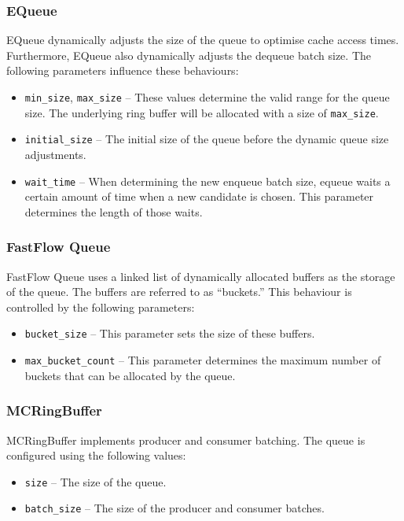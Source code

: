 \subsubsection*{EQueue}
EQueue dynamically adjusts the size of the queue to optimise cache access times\cite{EQueue}. Furthermore,
EQueue also dynamically adjusts the dequeue batch size. The following parameters influence these behaviours:
\begin{itemize}
    \item \texttt{min\_size}, \texttt{max\_size} -- These values determine the valid range for the queue size. The
        underlying ring buffer will be allocated with a size of \texttt{max\_size}.
    \item \texttt{initial\_size} -- The initial size of the queue before the dynamic queue size adjustments.
    \item \texttt{wait\_time} -- When determining the new enqueue batch size, equeue waits a certain amount of
        time when a new candidate is chosen. This parameter determines the length of those waits.
\end{itemize}

\subsubsection*{FastFlow Queue}
FastFlow Queue uses a linked list of dynamically allocated buffers as the storage of the queue\cite{FastFlowGithub}.
The buffers are referred to as ``buckets.''
This behaviour is controlled by the following parameters:
\begin{itemize}
    \item \texttt{bucket\_size} -- This parameter sets the size of these buffers.
    \item \texttt{max\_bucket\_count} -- This parameter determines the maximum number of buckets that can be
        allocated by the queue.
\end{itemize}

\subsubsection*{MCRingBuffer}
MCRingBuffer implements producer and consumer batching\cite{MCRingBuffer}.
The queue is configured using the following values:
\begin{itemize}
    \item \texttt{size} -- The size of the queue.
    \item \texttt{batch\_size} -- The size of the producer and consumer batches.
\end{itemize}

